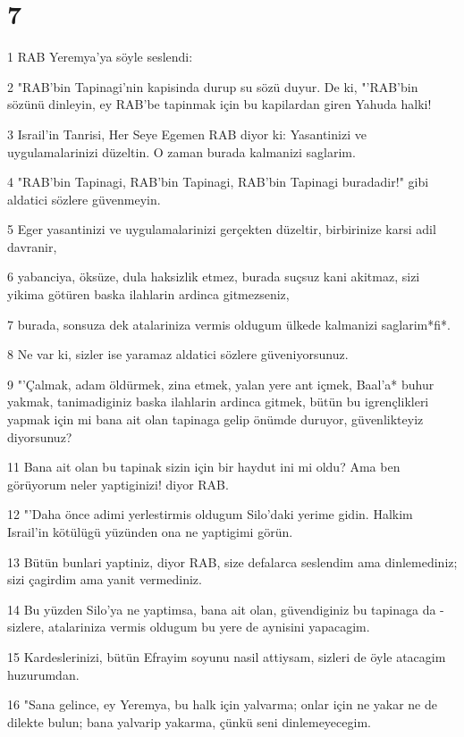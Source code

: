 \chapter{7}

\par 1 RAB Yeremya'ya söyle seslendi:
\par 2 "RAB'bin Tapinagi'nin kapisinda durup su sözü duyur. De ki, "'RAB'bin sözünü dinleyin, ey RAB'be tapinmak için bu kapilardan giren Yahuda halki!
\par 3 Israil'in Tanrisi, Her Seye Egemen RAB diyor ki: Yasantinizi ve uygulamalarinizi düzeltin. O zaman burada kalmanizi saglarim.
\par 4 "RAB'bin Tapinagi, RAB'bin Tapinagi, RAB'bin Tapinagi buradadir!" gibi aldatici sözlere güvenmeyin.
\par 5 Eger yasantinizi ve uygulamalarinizi gerçekten düzeltir, birbirinize karsi adil davranir,
\par 6 yabanciya, öksüze, dula haksizlik etmez, burada suçsuz kani akitmaz, sizi yikima götüren baska ilahlarin ardinca gitmezseniz,
\par 7 burada, sonsuza dek atalariniza vermis oldugum ülkede kalmanizi saglarim*fi*.
\par 8 Ne var ki, sizler ise yaramaz aldatici sözlere güveniyorsunuz.
\par 9 "'Çalmak, adam öldürmek, zina etmek, yalan yere ant içmek, Baal'a* buhur yakmak, tanimadiginiz baska ilahlarin ardinca gitmek, bütün bu igrençlikleri yapmak için mi bana ait olan tapinaga gelip önümde duruyor, güvenlikteyiz diyorsunuz?
\par 11 Bana ait olan bu tapinak sizin için bir haydut ini mi oldu? Ama ben görüyorum neler yaptiginizi! diyor RAB.
\par 12 "'Daha önce adimi yerlestirmis oldugum Silo'daki yerime gidin. Halkim Israil'in kötülügü yüzünden ona ne yaptigimi görün.
\par 13 Bütün bunlari yaptiniz, diyor RAB, size defalarca seslendim ama dinlemediniz; sizi çagirdim ama yanit vermediniz.
\par 14 Bu yüzden Silo'ya ne yaptimsa, bana ait olan, güvendiginiz bu tapinaga da -sizlere, atalariniza vermis oldugum bu yere de aynisini yapacagim.
\par 15 Kardeslerinizi, bütün Efrayim soyunu nasil attiysam, sizleri de öyle atacagim huzurumdan.
\par 16 "Sana gelince, ey Yeremya, bu halk için yalvarma; onlar için ne yakar ne de dilekte bulun; bana yalvarip yakarma, çünkü seni dinlemeyecegim.
